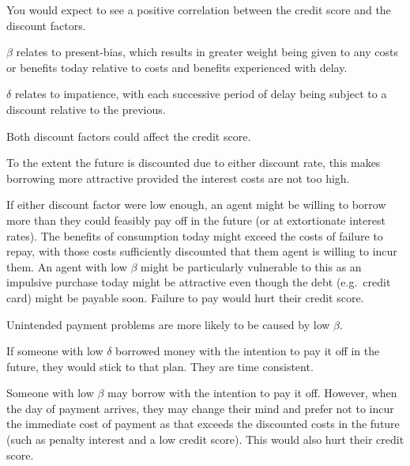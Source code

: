 \documentclass[
  letterpaper,
  DIV=11,
  numbers=noendperiod]{scrreprt}
\begin{document}
\begin{tcolorbox}[enhanced jigsaw, title=\textcolor{quarto-callout-tip-color}{\faLightbulb}\hspace{0.5em}{Answer}, toprule=.15mm, colback=white, breakable, titlerule=0mm, colframe=quarto-callout-tip-color-frame, coltitle=black, opacityback=0, rightrule=.15mm, colbacktitle=quarto-callout-tip-color!10!white, bottomtitle=1mm, opacitybacktitle=0.6, arc=.35mm, bottomrule=.15mm, toptitle=1mm, leftrule=.75mm, left=2mm]

You would expect to see a positive correlation between the credit score
and the discount factors.

\(\beta\) relates to present-bias, which results in greater weight being
given to any costs or benefits today relative to costs and benefits
experienced with delay.

\(\delta\) relates to impatience, with each successive period of delay
being subject to a discount relative to the previous.

Both discount factors could affect the credit score.

To the extent the future is discounted due to either discount rate, this
makes borrowing more attractive provided the interest costs are not too
high.

If either discount factor were low enough, an agent might be willing to
borrow more than they could feasibly pay off in the future (or at
extortionate interest rates). The benefits of consumption today might
exceed the costs of failure to repay, with those costs sufficiently
discounted that them agent is willing to incur them. An agent with low
\(\beta\) might be particularly vulnerable to this as an impulsive
purchase today might be attractive even though the debt (e.g.~credit
card) might be payable soon. Failure to pay would hurt their credit
score.

Unintended payment problems are more likely to be caused by low
\(\beta\).

If someone with low \(\delta\) borrowed money with the intention to pay
it off in the future, they would stick to that plan. They are time
consistent.

Someone with low \(\beta\) may borrow with the intention to pay it off.
However, when the day of payment arrives, they may change their mind and
prefer not to incur the immediate cost of payment as that exceeds the
discounted costs in the future (such as penalty interest and a low
credit score). This would also hurt their credit score.

\end{tcolorbox}
\end{document}
